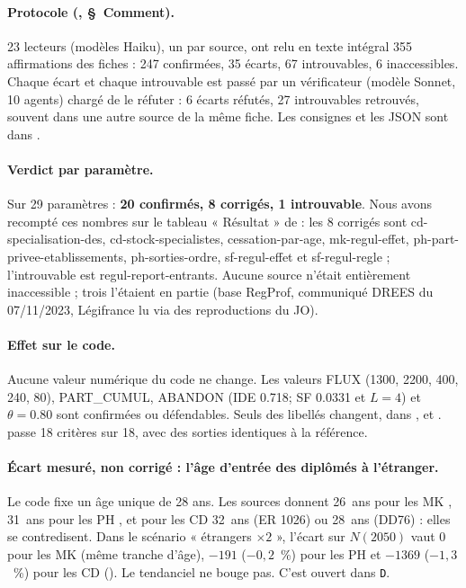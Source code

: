 \paragraph{Protocole (, \S~Comment).} 23\mesure{} lecteurs (modèles Haiku), un par source,
ont relu en texte intégral 355\mesure{} affirmations des fiches : 247\mesure{} confirmées, 35\mesure{} écarts,
67\mesure{} introuvables, 6\mesure{} inaccessibles. Chaque écart et chaque introuvable est passé par un
vérificateur (modèle Sonnet, 10\mesure{} agents) chargé de le réfuter : 6\mesure{} écarts réfutés,
27\mesure{} introuvables retrouvés, souvent dans une autre source de la même fiche. Les consignes et les JSON
sont dans .

\paragraph{Verdict par paramètre.} Sur 29\mesure{} paramètres : \textbf{20\mesure{} confirmés, 8\mesure{}
corrigés, 1\mesure{} introuvable}. Nous avons recompté ces nombres sur le tableau « Résultat » de
 : les 8 corrigés sont cd-specialisation-des, cd-stock-specialistes, cessation-par-age,
mk-regul-effet, ph-part-privee-etablissements, ph-sorties-ordre, sf-regul-effet et sf-regul-regle ;
l'introuvable est regul-report-entrants. Aucune source n'était entièrement inaccessible ; trois l'étaient en
partie (base RegProf, communiqué DREES du 07/11/2023, Légifrance lu via des reproductions du JO).

\paragraph{Effet sur le code.} Aucune valeur numérique du code ne change. Les valeurs FLUX (\num{1300},
\num{2200}, 400, 240, 80), PART\_CUMUL, ABANDON (IDE \num{0.718}\mesure ; SF \num{0.0331} et $L = 4$) et
$\theta = \num{0.80}$\suppose{} sont confirmées ou défendables. Seuls des libellés changent, dans
,  et .  passe
18\mesure{} critères sur 18, avec des sorties identiques à la référence.

\paragraph{Écart mesuré, non corrigé : l'âge d'entrée des diplômés à l'étranger.} Le code fixe un âge unique de
28\suppose{} ans. Les sources donnent 26~ans\mesure{} pour les MK \citep{d-er1075}, 31~ans\mesure{} pour les PH
\citep{d-dd76}, et pour les CD 32~ans\mesure{} (ER 1026) ou 28~ans\mesure{} (DD76) : elles se contredisent.
Dans le scénario « étrangers $\times 2$ », l'écart sur $N(2050)$ vaut 0\mesure{} pour les MK (même tranche
d'âge), $-191$\mesure{} ($-0{,}2$~\%\derive) pour les PH et $\num{-1369}$\mesure{} ($-1{,}3$~\%\derive) pour les
CD (). Le tendanciel ne bouge pas. C'est ouvert dans \texttt{D}.

